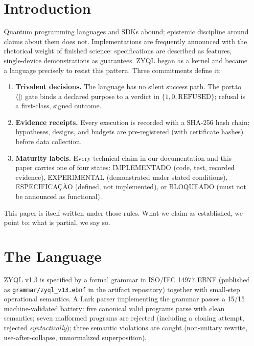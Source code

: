 \documentclass[11pt]{article}
\begin{document}
\section{Introduction}
Quantum programming languages and SDKs abound; epistemic discipline around claims about them does not. Implementations are frequently announced with the rhetorical weight of finished science: specifications are described as features, single-device demonstrations as guarantees. ZYQL began as a kernel and became a language precisely to resist this pattern. Three commitments define it:
\begin{enumerate}
\item \textbf{Trivalent decisions.} The language has no silent success path. The port\~ao $\langle|\rangle$ gate binds a declared purpose to a verdict in $\{1, 0, \mathrm{REFUSED}\}$; refusal is a first-class, signed outcome.
\item \textbf{Evidence receipts.} Every execution is recorded with a SHA-256 hash chain; hypotheses, designs, and budgets are pre-registered (with certificate hashes) before data collection.
\item \textbf{Maturity labels.} Every technical claim in our documentation and this paper carries one of four states: IMPLEMENTADO (code, test, recorded evidence), EXPERIMENTAL (demonstrated under stated conditions), ESPECIFICA\c{C}\~AO (defined, not implemented), or BLOQUEADO (must not be announced as functional).
\end{enumerate}
This paper is itself written under those rules. What we claim as established, we point to; what is partial, we say so.

\section{The Language}
ZYQL v1.3 is specified by a formal grammar in ISO/IEC 14977 EBNF (published as \texttt{grammar/zyql\_v13.ebnf} in the artifact repository) together with small-step operational semantics. A Lark parser implementing the grammar passes a 15/15 machine-validated battery: five canonical valid programs parse with clean semantics; seven malformed programs are rejected (including a cloning attempt, rejected \emph{syntactically}); three semantic violations are caught (non-unitary rewrite, use-after-collapse, unnormalized superposition).
\end{document}
